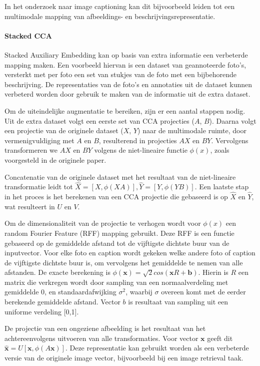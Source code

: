 In het onderzoek naar image captioning kan dit bijvoorbeeld leiden tot een multimodale mapping van afbeeldings- en beschrijvingsrepresentatie.

\paragraph{Stacked CCA}

Stacked Auxiliary Embedding\cite{Gong2014} kan op basis van extra informatie een verbeterde mapping maken. Een voorbeeld hiervan is een dataset van geannoteerde foto's, versterkt met per foto een set van stukjes van de foto met een bijbehorende beschrijving. De representaties van de foto's en annotaties uit de dataset kunnen verbeterd worden door gebruik te maken van de informatie uit de extra dataset.

Om de uiteindelijke augmentatie te bereiken, zijn er een aantal stappen nodig. Uit de extra dataset volgt een eerste set van CCA projecties ($A$, $B$). Daarna volgt een projectie van de originele dataset ($X$, $Y$) naar de multimodale ruimte, door vermenigvuldiging met $A$ en $B$, resulterend in projecties $AX$ en $BY$. Vervolgens transformeren we $AX$ en $BY$ volgens de niet-lineaire functie $\phi(x)$, zoals voorgesteld in de originele paper.

Concatenatie van de originele dataset met het resultaat van de niet-lineaire transformatie leidt tot $\hat{X} = [X, \phi(XA)], \hat{Y} = [Y, \phi(YB)]$. Een laatste stap in het proces is het berekenen van een CCA projectie die gebaseerd is op $\hat{X}$ en $\hat{Y}$, wat resulteert in $U$ en $V$.

Om de dimensionaliteit van de projectie te verhogen wordt voor $\phi(x)$ een random Fourier Feature (RFF) mapping gebruikt. Deze RFF is een functie gebaseerd op de gemiddelde afstand tot de vijftigste dichtste buur van de inputvector. Voor elke foto en caption wordt gekeken welke andere foto of caption de vijftigste dichtste buur is, om vervolgens het gemiddelde te nemen van alle afstanden. De exacte berekening is $\phi(\mathbf{x})=\sqrt{2}cos(\mathbf{x}R+\mathbf{b})$. Hierin is $R$ een matrix die verkregen wordt door sampling van een normaalverdeling met gemiddelde 0, en standaardafwijking $\sigma^2$, waarbij $\sigma$ overeen komt met de eerder berekende gemiddelde afstand. Vector $b$ is resultaat van sampling uit een uniforme verdeling [0,1].

De projectie van een ongeziene afbeelding is het resultaat van het achtereenvolgens uitvoeren van alle transformaties. Voor vector $\mathbf{x}$ geeft dit $\mathbf{\hat{x}} = U[\mathbf{x}, \phi(A\mathbf{x})]$. Deze representatie kan gebruikt worden als een verbeterde versie van de originele image vector, bijvoorbeeld bij een image retrieval taak.
